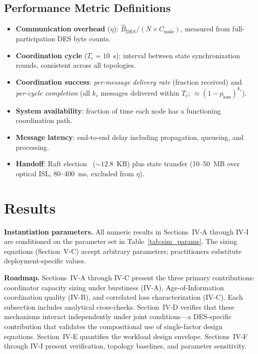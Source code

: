 \documentclass[journal]{IEEEtran}
\begin{document}
\subsection{Performance Metric Definitions}
\label{sec:metric_definitions}

\begin{itemize}
    \item \textbf{Communication overhead} ($\eta$): $\hat{B}_{\text{DES}} / (N \times C_{\text{node}})$, measured from full-participation DES byte counts.
    \item \textbf{Coordination cycle} ($T_c = 10$~s): interval between state synchronization rounds, consistent across all topologies.
    \item \textbf{Coordination success}: \emph{per-message delivery rate} (fraction received) and \emph{per-cycle completion} (all $k_c$ messages delivered within $T_c$; $\approx (1 - p_{\text{loss}})^{k_c}$).
    \item \textbf{System availability}: fraction of time each node has a functioning coordination path.
    \item \textbf{Message latency}: end-to-end delay including propagation, queueing, and processing.
    \item \textbf{Handoff}: Raft election~\cite{ongaro_raft} (${\sim}12.8$~KB) plus state transfer (10--50~MB over optical ISL, 80--400~ms, excluded from $\eta$).
\end{itemize}

\section{Results}

\textbf{Instantiation parameters.} All numeric results in Sections~IV-A through IV-I are conditioned on the parameter set in Table~\ref{tab:sim_params}. The sizing equations (Section~V-C) accept arbitrary parameters; practitioners substitute deployment-specific values.

\textbf{Roadmap.} Sections~IV-A through IV-C present the three primary contributions: coordinator capacity sizing under burstiness (IV-A), Age-of-Information coordination quality (IV-B), and correlated loss characterization (IV-C). Each subsection includes analytical cross-checks. Section~IV-D verifies that these mechanisms interact independently under joint conditions---a DES-specific contribution that validates the compositional use of single-factor design equations. Section~IV-E quantifies the workload design envelope. Sections~IV-F through IV-I present verification, topology baselines, and parameter sensitivity.
\end{document}
